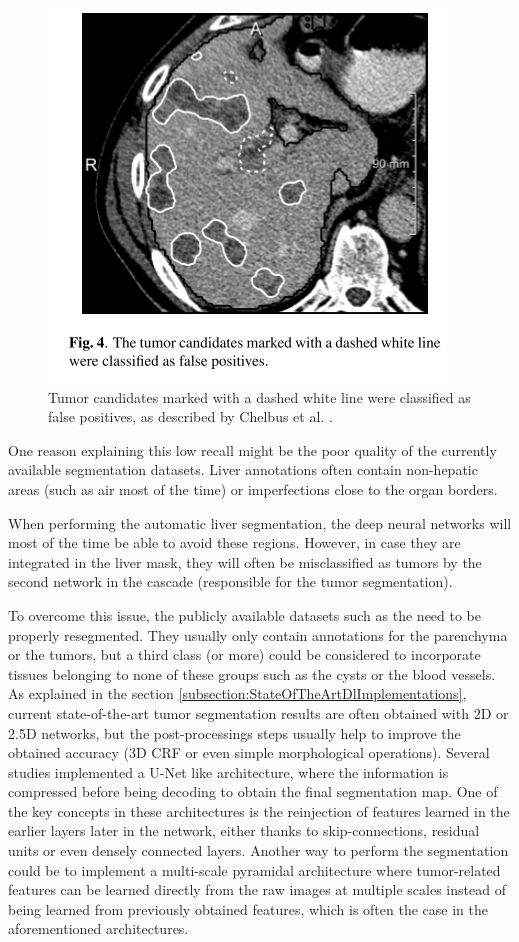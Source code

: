 \begin{figure}[th!]
\centering
\includegraphics[width=0.5\linewidth]{Perspectives/images/image5}
\caption{Tumor candidates marked with a dashed white line were classified as false positives, as described by Chelbus et al. \cite{Chlebus2018}.}
\label{fig:image5}
\end{figure}

One reason explaining this low recall might be the poor quality of the
currently available segmentation datasets. Liver annotations often
contain non-hepatic areas (such as air most of the time) or
imperfections close to the organ borders.

When performing the automatic liver segmentation, the deep neural
networks will most of the time be able to avoid these regions. However,
in case they are integrated in the liver mask, they will often be
misclassified as tumors by the second network in the cascade
(responsible for the tumor segmentation).

To overcome this issue, the publicly available datasets such as the
 need to be properly resegmented. They usually only contain
annotations for the parenchyma or the tumors, but a third class (or
more) could be considered to incorporate tissues belonging to none of
these groups such as the cysts or the blood vessels.\\
As explained in the section  \ref{subsection:StateOfTheArtDlImplementations}, current state-of-the-art tumor
segmentation results are often obtained with 2D or 2.5D networks, but
the post-processings steps usually help to improve the obtained accuracy
(3D CRF or even simple morphological operations). Several studies
implemented a U-Net like architecture, where the information is
compressed before being decoding to obtain the final segmentation map.
One of the key concepts in these architectures is the reinjection of
features learned in the earlier layers later in the network, either
thanks to skip-connections, residual units or even densely connected
layers. Another way to perform the segmentation could be to implement a
multi-scale pyramidal architecture where tumor-related features can be
learned directly from the raw images at multiple scales instead of being
learned from previously obtained features, which is often the case in
the aforementioned architectures.

